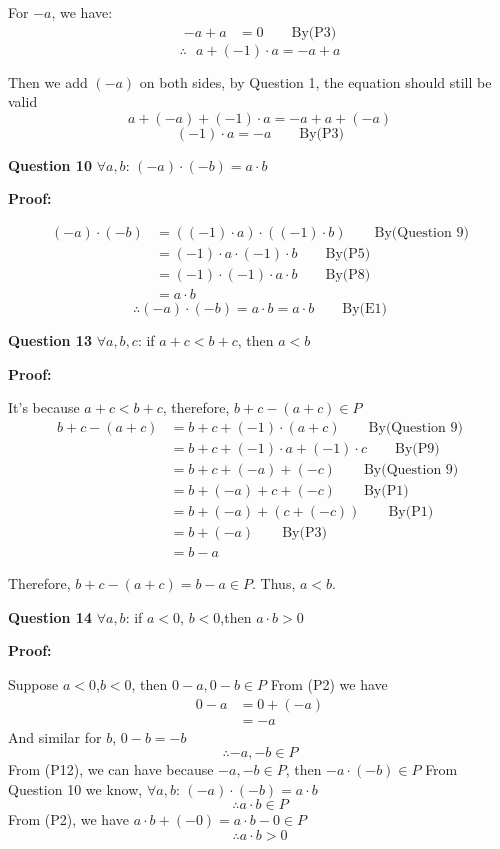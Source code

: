 \documentclass[a4paper,12pt]{report}
\begin{document}
For $-a$, we have:
\begin{align*}
 -a + a & = 0 \qquad \text{By(P3)}
\end{align*}
\[\therefore \text{ } a + (-1)\cdot{a} =  -a + a\]

\noindent
Then we add $(-a)$ on both sides, by Question 1, the equation should still be valid
\[a  +(-a) + (-1)\cdot{a} =  -a + a +(-a)\]
\[(-1)\cdot{a}=-a \qquad\text{By(P3)}\]

\noindent
\textbf{Question 10} $\forall a,b$: $(-a)\cdot{(-b)}=a\cdot{b}$

\noindent
\textbf{Proof:}

\begin{align*}
 (-a)\cdot{(-b)} & = ((-1)\cdot{a}) \cdot({ (-1)}\cdot{b})\qquad \text{By(Question 9)}\\
 & = (-1)\cdot{a} \cdot{ (-1)}\cdot{b}\qquad \text{By(P5)}\\
      & = (-1)\cdot{(-1)}\cdot{a}\cdot{b}\qquad \text{By(P8)}\\
      & = a\cdot{b}
\end{align*}
\[\therefore (-a)\cdot{(-b)}=a\cdot{b}=a\cdot{b}\qquad \text{By(E1)}\]

\noindent
\textbf{Question 13} $\forall a,b,c$: if $a+c<b+c$, then $a<b$

\noindent
\textbf{Proof:}

\noindent
It's because $a+c<b+c$, therefore, $b+c-(a+c)\in P$
\begin{align*}
 b+c-(a+c) & = b+c+(-1)\cdot{(a+c)} \qquad \text{By(Question 9)}\\
 & = b+c+(-1)\cdot{a} +(-1)\cdot{c}\qquad \text{By(P9)}\\
      & = b+c+(-a) +(-c) \qquad \text{By(Question 9)}\\
      & = b+(-a)+c+(-c)\qquad\text{By(P1)}\\
      & = b+(-a)+(c+(-c))\qquad\text{By(P1)}\\
      & = b+(-a)\qquad\text{By(P3)}\\
      & = b-a
\end{align*}

\noindent
Therefore, $b+c-(a+c)=b-a\in P$. Thus, $a<b$.

\noindent
\textbf{Question 14} $\forall a,b$: if $a<0$, $b<0$,then $a\cdot{b}>0$

\noindent
\textbf{Proof:}

\noindent
Suppose $a<0$,$b<0$, then $0-a,0-b\in P$
From (P2) we have 
\begin{align*}
 0 -a & = 0+(-a)\\
 & = -a
\end{align*}
And similar for $b$, $0-b=-b$
\[\therefore -a,-b \in P\]
From (P12), we can have because $-a,-b \in P$, then $-a\cdot{(-b)}\in P$
From Question 10 we know, $\forall a,b$: $(-a)\cdot{(-b)}=a\cdot{b}$
\[\therefore a\cdot{b}\in P\]
From (P2), we have $a\cdot{b} +(-0)=a\cdot{b}-0\in P$
\[\therefore a\cdot{b}>0\]
\end{document}
